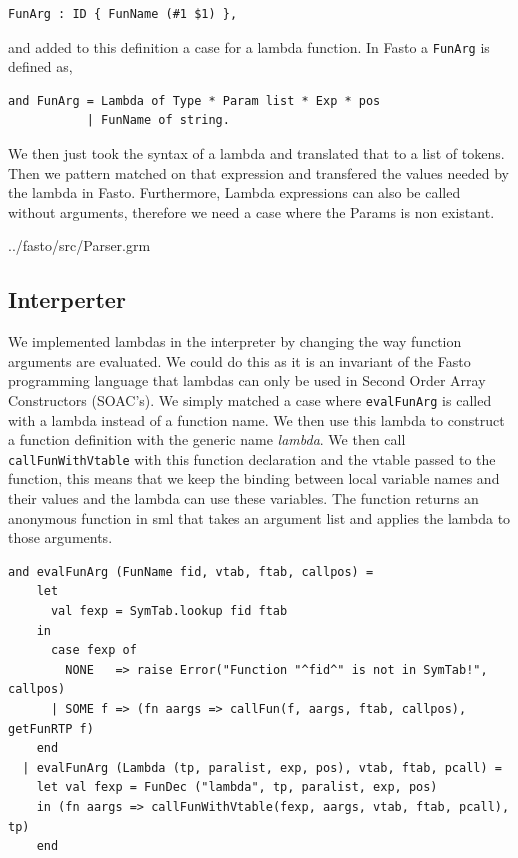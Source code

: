 \documentclass[11pt]{article}
\begin{document}
    \begin{lstlisting}[firstnumber=125]
FunArg : ID { FunName (#1 $1) },
    \end{lstlisting}

    and added to this definition a case for a lambda function.  In Fasto a
    \texttt{FunArg} is defined as,

    \begin{lstlisting}
and FunArg = Lambda of Type * Param list * Exp * pos
           | FunName of string.
    \end{lstlisting}

    We then just took the syntax of a lambda and translated that to a list of
    tokens.  Then we pattern matched on that expression and transfered the
    values needed by the lambda in Fasto. Furthermore, Lambda expressions can also
    be called without arguments, therefore we need a case where the Params is non
    existant.


{../fasto/src/Parser.grm}

\subsection{Interperter}
    We implemented lambdas in the interpreter by changing the way function
    arguments are evaluated.  We could do this as it is an invariant of the
    Fasto programming language that lambdas can only be used in Second Order
    Array Constructors (SOAC's).  We simply matched a case where
    \texttt{evalFunArg} is called with a lambda instead of a function name.  We
    then use this lambda to construct a function definition with the generic
    name \textit{lambda}.  We then call \texttt{callFunWithVtable} with this
    function declaration and the vtable passed to the function, this means that
    we keep the binding between local variable names and their values and the
    lambda can use these variables.  The function returns an anonymous function
    in sml that takes an argument list and applies the lambda to those
    arguments.

    \begin{lstlisting}[firstnumber=507]
and evalFunArg (FunName fid, vtab, ftab, callpos) =
    let
      val fexp = SymTab.lookup fid ftab
    in
      case fexp of
        NONE   => raise Error("Function "^fid^" is not in SymTab!", callpos)
      | SOME f => (fn aargs => callFun(f, aargs, ftab, callpos), getFunRTP f)
    end
  | evalFunArg (Lambda (tp, paralist, exp, pos), vtab, ftab, pcall) =
    let val fexp = FunDec ("lambda", tp, paralist, exp, pos)
    in (fn aargs => callFunWithVtable(fexp, aargs, vtab, ftab, pcall), tp)
    end
    \end{lstlisting}
\end{document}
